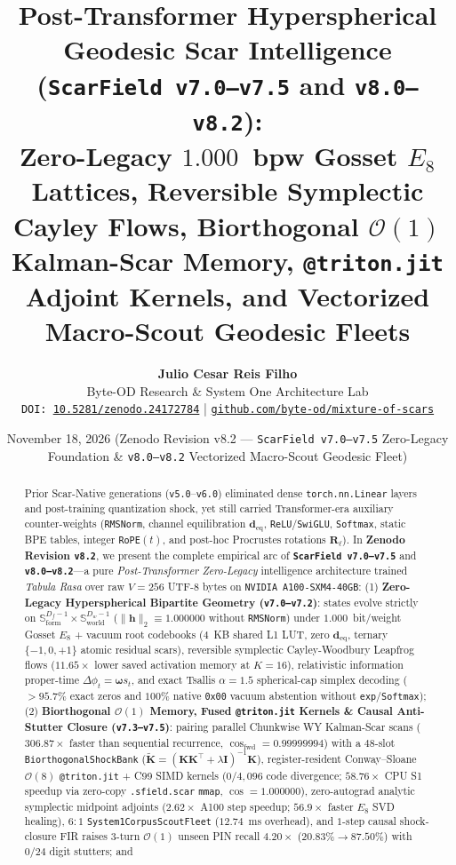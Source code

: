 \documentclass[10pt,twocolumn]{article}
\title{\textbf{Post-Transformer Hyperspherical Geodesic Scar Intelligence (\texttt{ScarField v7.0--v7.5} and \texttt{v8.0--v8.2}):\\Zero-Legacy $1.000$~bpw Gosset $E_8$ Lattices, Reversible Symplectic Cayley Flows, Biorthogonal $\mathcal{O}(1)$ Kalman-Scar Memory, \texttt{@triton.jit} Adjoint Kernels, and Vectorized Macro-Scout Geodesic Fleets}}
\author{
  \textbf{Julio Cesar Reis Filho}\\
  Byte-OD Research \& System One Architecture Lab\\
  \texttt{DOI: \href{https://doi.org/10.5281/zenodo.24172784}{10.5281/zenodo.24172784}} \quad|\quad
  \texttt{\href{https://github.com/byte-od/mixture-of-scars}{github.com/byte-od/mixture-of-scars}}
}
\date{November 18, 2026 \quad (Zenodo Revision v8.2 --- \texttt{ScarField v7.0--v7.5} Zero-Legacy Foundation \& \texttt{v8.0--v8.2} Vectorized Macro-Scout Geodesic Fleet)}
\begin{document}
\maketitle

\begin{abstract}
Prior Scar-Native generations (\texttt{v5.0}--\texttt{v6.0}) eliminated dense \texttt{torch.nn.Linear} layers and post-training quantization shock, yet still carried Transformer-era auxiliary counter-weights (\texttt{RMSNorm}, channel equilibration $\mathbf{d}_{\text{eq}}$, \texttt{ReLU}/\texttt{SwiGLU}, \texttt{Softmax}, static BPE tables, integer \texttt{RoPE}$(t)$, and post-hoc Procrustes rotations $\mathbf{R}_\ell$). In \textbf{Zenodo Revision \texttt{v8.2}}, we present the complete empirical arc of \textbf{\texttt{ScarField v7.0--v7.5}} and \textbf{\texttt{v8.0--v8.2}}---a pure \emph{Post-Transformer Zero-Legacy} intelligence architecture trained \emph{Tabula Rasa} over raw $V=256$ UTF-8 bytes on \texttt{NVIDIA A100-SXM4-40GB}:
(1) \textbf{Zero-Legacy Hyperspherical Bipartite Geometry (\texttt{v7.0--v7.2})}: states evolve strictly on $\mathbb{S}_{\text{form}}^{D_f-1} \times \mathbb{S}_{\text{world}}^{D_w-1}$ ($\|\mathbf{h}\|_2 \equiv 1.000000$ without \texttt{RMSNorm}) under $1.000$~bit/weight Gosset $E_8$ + vacuum root codebooks ($4$~KB shared L1 LUT, zero $\mathbf{d}_{\text{eq}}$, ternary $\{-1,0,+1\}$ atomic residual scars), reversible symplectic Cayley-Woodbury Leapfrog flows ($\mathbf{11.65\times}$ lower saved activation memory at $K=16$), relativistic information proper-time $\Delta\phi_t = \boldsymbol{\omega} s_t$, and exact Tsallis $\alpha=1.5$ spherical-cap simplex decoding ($>95.7\%$ exact zeros and $100\%$ native \texttt{0x00} vacuum abstention without \texttt{exp}/\texttt{Softmax});
(2) \textbf{Biorthogonal $\mathcal{O}(1)$ Memory, Fused \texttt{@triton.jit} Kernels \& Causal Anti-Stutter Closure (\texttt{v7.3--v7.5})}: pairing parallel Chunkwise WY Kalman-Scar scans ($\mathbf{306.87\times}$ faster than sequential recurrence, $\cos_{\text{fwd}}=0.99999994$) with a $48$-slot \texttt{BiorthogonalShockBank} ($\widetilde{\mathbf{K}} = (\mathbf{K}\mathbf{K}^\top + \lambda\mathbf{I})^{-1}\mathbf{K}$), register-resident Conway--Sloane $\mathcal{O}(8)$ \texttt{@triton.jit} + C99 SIMD kernels ($0/4{,}096$ code divergence; $58.76\times$ CPU S1 speedup via zero-copy \texttt{.sfield.scar} \texttt{mmap}, $\cos=1.000000$), zero-autograd analytic symplectic midpoint adjoints ($2.62\times$ A100 step speedup; $56.9\times$ faster $E_8$ SVD healing), $6:1$ \texttt{System1CorpusScoutFleet} ($12.74$~ms overhead), and $1$-step causal shock-closure FIR raises $3$-turn $\mathcal{O}(1)$ unseen PIN recall $4.20\times$ ($20.83\% \to 87.50\%$) with $0/24$ digit stutters; and

\end{abstract}
\end{document}
